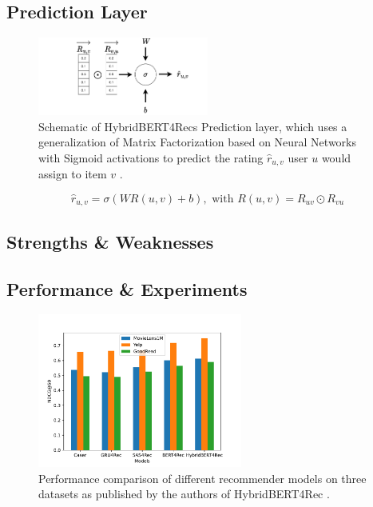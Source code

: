 \documentclass{Academic}
\begin{document}
        \subsection{Prediction Layer}
        \begin{figure}[ht!]
            \centering
            \includegraphics[width=0.5\textwidth]{images/Prediction_Layer.pdf}
            \caption{Schematic of HybridBERT4Recs Prediction layer, which uses a generalization of Matrix Factorization based on Neural Networks with Sigmoid activations to predict the rating $\hat{r}_{u,v}$ user $u$ would assign to item $v$ \cite{channarongHybridBERT4RecHybridContentBased2022}.}
            \label{fig:pred_layer}
        \end{figure}
        \begin{equation}
            \hat{r}_{u,v} = \sigma(WR(u,v) + b), \text{ with }
            R(u,v) = R_{uv} \odot R_{vu}
        \end{equation}

        \subsection{Strengths \& Weaknesses}

        \subsection{Performance \& Experiments}
        \begin{figure}[ht!]
            \centering
			\includegraphics[width=0.6\textwidth]{images/results.pdf}
			\caption{Performance comparison of different recommender models on three datasets as published by the authors of HybridBERT4Rec \cite{channarongHybridBERT4RecHybridContentBased2022}.}
            \label{fig:perfExp}
		\end{figure}
\end{document}
